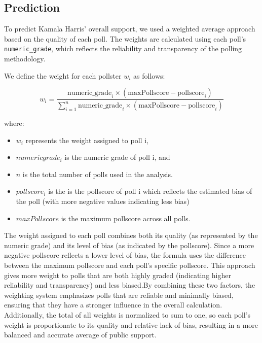 \documentclass[
  letterpaper,
  DIV=11,
  numbers=noendperiod]{scrartcl}
\begin{document}
\hypertarget{prediction}{%
\subsection{Prediction}\label{prediction}}

To predict Kamala Harris' overall support, we used a weighted average
approach based on the quality of each poll. The weights are calculated
using each poll's \texttt{numeric\_grade}, which reflects the
reliability and transparency of the polling methodology.

We define the weight for each pollster \(w_i\) as follows:

\[
w_i = \frac{\mathrm{numeric\_grade}_i \times (\mathrm{maxPollscore} - \mathrm{pollscore}_i)}{\sum_{i=1}^{n} \mathrm{numeric\_grade}_i \times (\mathrm{maxPollscore} - \mathrm{pollscore}_i)}
\]

where:

\begin{itemize}
\item
  \(w_i\)\hspace{0pt} represents the weight assigned to poll i,
\item
  \(numericgrade_i\) is the numeric grade of poll i, and
\item
  \(n\) is the total number of polls used in the analysis.
\item
  \(pollscore_i\) is the is the pollscore of poll i which reflects the
  estimated bias of the poll (with more negative values indicating less
  bias)
\item
  \(maxPollscore\) is the maximum pollscore across all polls.
\end{itemize}

The weight assigned to each poll combines both its quality (as
represented by the numeric grade) and its level of bias (as indicated by
the pollscore). Since a more negative pollscore reflects a lower level
of bias, the formula uses the difference between the maximum pollscore
and each poll's specific pollscore. This approach gives more weight to
polls that are both highly graded (indicating higher reliability and
transparency) and less biased.By combining these two factors, the
weighting system emphasizes polls that are reliable and minimally
biased, ensuring that they have a stronger influence in the overall
calculation. Additionally, the total of all weights is normalized to sum
to one, so each poll's weight is proportionate to its quality and
relative lack of bias, resulting in a more balanced and accurate average
of public support.
\end{document}

